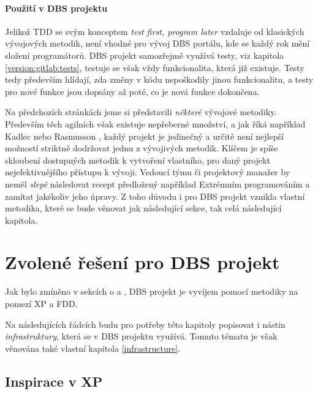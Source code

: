 \paragraph{Použití v DBS projektu}
Jelikož TDD se svým konceptem \emph{test first, program later} vzdaluje od klasických vývojových metodik, není vhodné pro vývoj DBS portálu, kde se každý rok mění složení programátorů. DBS projekt samozřejmě využívá testy, viz kapitola \ref{version:gitlab:tests}, testuje se však vždy funkcionalita, která již existuje. Testy tedy především hlídají, zda změny v kódu nepoškodily jinou funkcionalitu, a testy pro nové funkce jsou dopsány až poté, co je nová funkce dokončena.



Na předchozích stránkách jsme si představili \emph{některé} vývojové metodiky. Především těch agilních však existuje nepřeberné množství, a jak říká například Kadlec \cite{kadlec} nebo Rasmusson \cite{rasmusson}, každý projekt je jedinečný a určitě není nejlepší možností striktně dodržovat jednu z vývojivých metodik. Klíčem je spíše skloubení dostupných metodik k vytvoření vlastního, pro daný projekt nejefektivnějšího přístupu k vývoji. Vedoucí týmu či projektový manažer by neměl \emph{slepě} následovat recept předložený například Extrémním programováním a zamítat jakékoliv jeho úpravy. Z toho důvodu i pro DBS projekt vznikla vlastní metodika, které se bude věnovat jak následující sekce, tak celá následující kapitola.


\section{Zvolené řešení pro DBS projekt} \label{methods:dbs}

Jak bylo zmíněno v sekcích o \emph{} a \emph{}, DBS projekt je vyvíjem pomocí metodiky na pomezí XP a FDD.

Na následujících řádcích budu pro potřeby této kapitoly popisovat i nástin \emph{infrastruktury}, která se v DBS projektu využívá. Tomuto tématu je však věnována také vlastní kapitola \ref{infrastructure}.


\subsection{Inspirace v XP}

